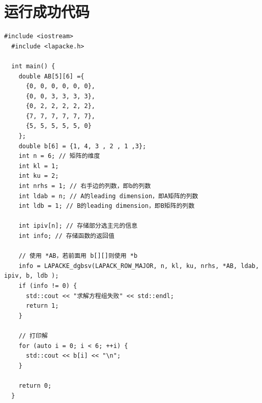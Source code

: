 \documentclass[a4paper,7pt,onecolumn,oneside]{article}
\begin{document}
\section{运行成功代码}

\begin{lstlisting}[style = ccstyle]
  #include <iostream>
  #include <lapacke.h>

  int main() {
    double AB[5][6] ={
      {0, 0, 0, 0, 0, 0},
      {0, 0, 3, 3, 3, 3},
      {0, 2, 2, 2, 2, 2},
      {7, 7, 7, 7, 7, 7},
      {5, 5, 5, 5, 5, 0}
    };
    double b[6] = {1, 4, 3 , 2 , 1 ,3};
    int n = 6; // 矩阵的维度
    int kl = 1;
    int ku = 2;
    int nrhs = 1; // 右手边的列数，即b的列数
    int ldab = n; // A的leading dimension，即A矩阵的列数
    int ldb = 1; // B的leading dimension，即B矩阵的列数

    int ipiv[n]; // 存储部分选主元的信息
    int info; // 存储函数的返回值

    // 使用 *AB，若前面用 b[][]则使用 *b
    info = LAPACKE_dgbsv(LAPACK_ROW_MAJOR, n, kl, ku, nrhs, *AB, ldab, ipiv, b, ldb );
    if (info != 0) {
      std::cout << "求解方程组失败" << std::endl;
      return 1;
    }

    // 打印解
    for (auto i = 0; i < 6; ++i) {
      std::cout << b[i] << "\n";
    }

    return 0;
  }

\end{lstlisting}
\end{document}
